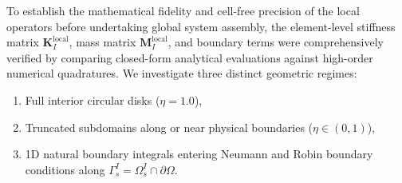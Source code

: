 \documentclass[preprint,12pt]{elsarticle}
\begin{document}
To establish the mathematical fidelity and cell-free precision of the local operators before undertaking global system assembly, the element-level stiffness matrix $\mathbf{K}_I^{\mathrm{local}}$, mass matrix $\mathbf{M}_I^{\mathrm{local}}$, and boundary terms were comprehensively verified by comparing closed-form analytical evaluations against high-order numerical quadratures. We investigate three distinct geometric regimes:
\begin{enumerate}
    \item Full interior circular disks ($\eta = 1.0$),
    \item Truncated subdomains along or near physical boundaries ($\eta \in (0, 1)$),
    \item 1D natural boundary integrals entering Neumann and Robin boundary conditions along $\Gamma_s^I = \Omega_s^I \cap \partial\Omega$.
\end{enumerate}
\end{document}
